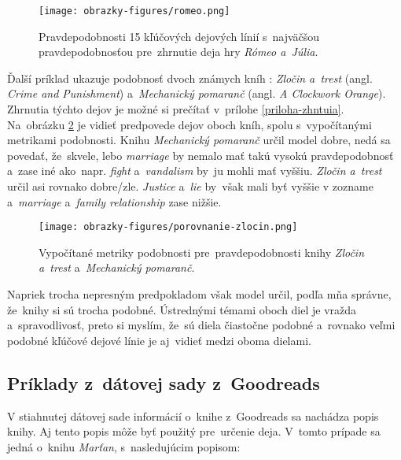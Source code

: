 \begin{figure}[ht!]
	\centering
	\texttt{[image: obrazky-figures/romeo.png]}
	\caption{Pravdepodobnosti 15 kľúčových dejových línií s~najväčšou pravdepodobnosťou pre~zhrnutie deja hry \textit{Rómeo a~Júlia}.}
	\label{romeo}
\end{figure}


Ďalší príklad ukazuje podobnosť dvoch známych kníh : \textit{Zločin a~trest} (angl. \textit{Crime and Punishment}) a~\textit{Mechanický pomaranč} (angl. \textit{A Clockwork Orange}). Zhrnutia týchto dejov je možné si prečítať v~prílohe \ref{priloha-zhntuia}. Na~obrázku \ref{porovnanie-zlocin} je vidieť predpovede dejov oboch kníh, spolu s~vypočítanými metrikami podobnosti. Knihu \textit{Mechanický pomaranč} určil model dobre, nedá sa povedať, že~skvele, lebo \textit{marriage} by nemalo mať takú vysokú pravdepodobnosť a~zase iné ako~napr. \textit{fight} a~\textit{vandalism} by~ju mohli mať vyššiu. \textit{Zločin a~trest} určil asi rovnako dobre/zle. \textit{Justice} a~\textit{lie} by~však mali byť vyššie v zozname a~\textit{marriage} a~\textit{family relationship} zase nižšie. 

\begin{figure}[ht!]
	\centering
	\texttt{[image: obrazky-figures/porovnanie-zlocin.png]}
	\caption{Vypočítané metriky podobnosti pre~pravdepodobnosti knihy \textit{Zločin a~trest} a~\textit{Mechanický pomaranč}.}
	\label{porovnanie-zlocin}
\end{figure}

\pagebreak
Napriek trocha nepresným predpokladom však model určil, podľa mňa správne, že~knihy si sú trocha podobné.  Ústrednými témami oboch diel je vražda a~spravodlivosť, preto si myslím, že~sú diela čiastočne podobné a~rovnako veľmi podobné kľúčové dejové línie je aj~vidieť medzi oboma dielami.

\pagebreak
\subsection*{Príklady z~dátovej sady z~Goodreads}

V stiahnutej dátovej sade informácií o~knihe z~Goodreads sa nachádza popis knihy. Aj tento popis môže byť použitý pre~určenie deja. V~tomto prípade sa jedná o~knihu \textit{Marťan}, s~nasledujúcim popisom: 

